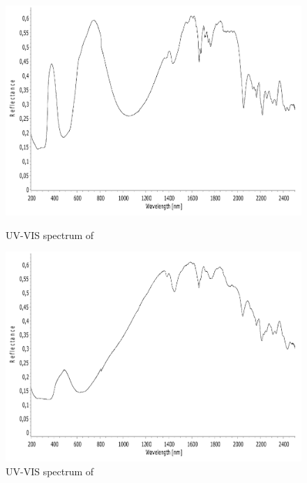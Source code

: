 \begin{figure}[!htpb]
\centering
\includegraphics[scale=0.43]{figures/CoD4HOMP-VIS.pdf}
\caption*{UV-VIS spectrum of }
\label{fig:CoD4HOMP_vis}
\includegraphics[scale=0.43]{figures/CuD4HOMP-VIS.pdf}
\caption*{UV-VIS spectrum of }
\label{fig:CuD4HOMP_vis}
\end{figure}


